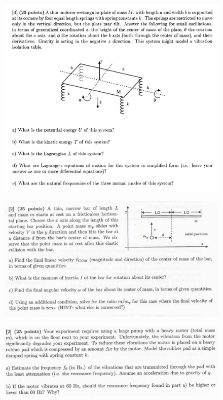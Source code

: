 \documentclass[10pt,a4paper]{article}
\begin{document}
\begin{figure}[H]
 \centering
 \includegraphics[width=16cm]{pdf/1-1T13.png}
\end{figure}
 \newpage
\begin{figure}[H]
 \centering
 \includegraphics[width=16cm]{pdf/1-1T14.png}
\end{figure}
 \newpage
\begin{figure}[H]
 \centering
 \includegraphics[width=16cm]{pdf/1-1T15.png}
\end{figure}
\end{document}
